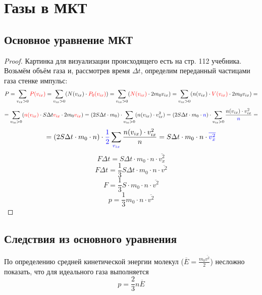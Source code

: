 \section{Газы в МКТ}




\subsection{Основное уравнение МКТ}
\begin{proof}
	Картинка для визуализации происходящего есть на стр. 112 учебника. Возьмём объём газа и, рассмотрев время $\Delta t$, определим переданный частицами газа стенке импульс:
	\[\displaystyle P = \sum_{v_{ix}>0}{\color{red}P(v_{ix})}=\sum_{v_{ix}>0}(N(v_{ix})\cdot{\color{red}P_0(v_{ix})})=\sum_{v_{ix}>0}({\color{red}N(v_{ix})}\cdot2 m_0 v_{ix})=
	\sum_{v_{ix}>0}(n(v_{ix})\cdot {\color{red}V(v_{ix})}\cdot2 m_0 v_{ix})=
	\]
	\[=\sum_{v_{ix}>0}({\color{red}n(v_{ix})}\cdot S \Delta t {\color{red}v_{ix}}\cdot2 m_0 {\color{red}v_{ix}})=
	(2S \Delta t \cdot m_0) \cdot \sum_{v_{ix}>0}(n(v_{ix})\cdot v_{ix}^2)=
	(2S \Delta t \cdot m_0 \cdot {\color{blue}n}) \cdot \sum_{v_{ix}>0}\frac{n(v_{ix})\cdot v_{ix}^2}{\color{blue}n}=\]
	\[
	=(2S \Delta t \cdot m_0 \cdot n) \cdot {\color{blue}\frac{1}{2}}\sum_{\color{blue}v_{ix}}\frac{n(v_{ix})\cdot v_{ix}^2}{n}=
	S \Delta t \cdot m_0 \cdot n \cdot {\color{blue}\overline{v_{x}^2}}
	\]
	\[F \Delta t = S \Delta t \cdot m_0 \cdot n \cdot \overline{v_{x}^2}\]
	\[F \Delta t = \frac{1}{3} S \Delta t \cdot m_0 \cdot n \cdot \overline{v^2}\]
	\[F = \frac{1}{3} S \cdot m_0 \cdot n \cdot \overline{v^2}\]
	\[p = \frac{1}{3} m_0 \cdot n \cdot \overline{v^2}\]
\end{proof}


\subsection{Следствия из основного уравнения}
По определению средней кинетической энергии молекул ($\displaystyle \overline{E}=\frac{m_0\overline{v^2}}{2}$) несложно показать, что для идеального газа выполняется
\begin{equation}
	p = \frac{2}{3} n \overline{E}
\end{equation}

